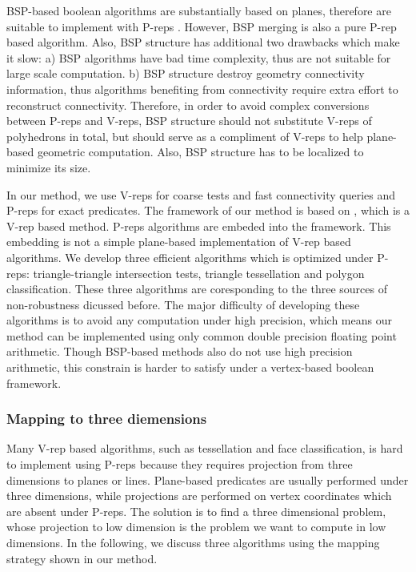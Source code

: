 BSP-based boolean algorithms are substantially based on planes, therefore are suitable to implement with P-reps \cite{bernstein2009fast,campen2010exact}. However, BSP merging is also a pure P-rep based algorithm. Also, BSP structure has additional two drawbacks which make it slow: a) BSP algorithms have bad time complexity, thus are not suitable for large scale computation. b) BSP structure destroy geometry connectivity information, thus algorithms benefiting from connectivity require extra effort to reconstruct connectivity. Therefore, in order to avoid complex conversions between P-reps and V-reps, BSP structure should not substitute V-reps of polyhedrons in total, but should serve as a compliment of V-reps to help plane-based geometric computation. Also, BSP structure has to be localized to minimize its size.

In our method, we use V-reps for coarse tests and fast connectivity queries and P-reps for exact predicates. The framework of our method is based on \cite{ogayar2015deferred}, which is a V-rep based method. P-reps algorithms are embeded into the framework. This embedding is not a simple plane-based implementation of V-rep based algorithms. We develop three efficient algorithms which is optimized under P-reps: triangle-triangle intersection tests, triangle tessellation and polygon classification. These three algorithms are coresponding to the three sources of non-robustness dicussed before. The major difficulty of developing these algorithms is to avoid any computation under high precision, which means our method can be implemented using only common double precision floating point arithmetic. Though BSP-based methods \cite{bernstein2009fast,campen2010exact} also do not use high precision arithmetic, this constrain is harder to satisfy under a vertex-based boolean framework.


\subsubsection{Mapping to three diemensions}

Many V-rep based algorithms, such as tessellation and face classification, is hard to implement using P-reps because they requires projection from three dimensions to planes or lines. Plane-based predicates \cite{bernstein2009fast,banerjee1996topologically} are usually performed under three dimensions, while projections are performed on vertex coordinates which are absent under P-reps. The solution is to find a three dimensional problem, whose projection to low dimension is the problem we want to compute in low dimensions. In the following, we discuss three algorithms using the mapping strategy shown in our method.

